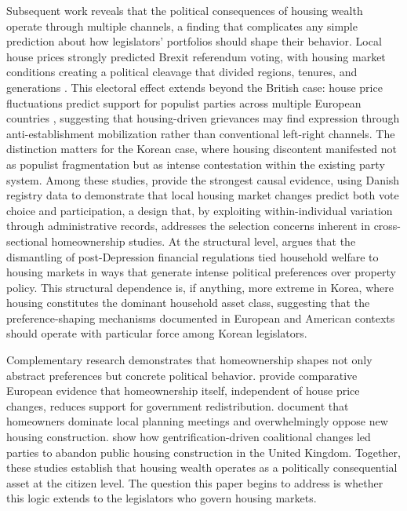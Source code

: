 \documentclass[11pt]{article}
\begin{document}
Subsequent work reveals that the political consequences of housing wealth operate through multiple channels, a finding that complicates any simple prediction about how legislators' portfolios should shape their behavior. Local house prices strongly predicted Brexit referendum voting, with housing market conditions creating a political cleavage that divided regions, tenures, and generations \citep{ansellAdler2019}. This electoral effect extends beyond the British case: house price fluctuations predict support for populist parties across multiple European countries \citep{ansellEtAl2021}, suggesting that housing-driven grievances may find expression through anti-establishment mobilization rather than conventional left-right channels. The distinction matters for the Korean case, where housing discontent manifested not as populist fragmentation but as intense contestation within the existing party system. Among these studies, \citet{larsen2019} provide the strongest causal evidence, using Danish registry data to demonstrate that local housing market changes predict both vote choice and participation, a design that, by exploiting within-individual variation through administrative records, addresses the selection concerns inherent in cross-sectional homeownership studies. At the structural level, \citet{schwartz2012} argues that the dismantling of post-Depression financial regulations tied household welfare to housing markets in ways that generate intense political preferences over property policy. This structural dependence is, if anything, more extreme in Korea, where housing constitutes the dominant household asset class, suggesting that the preference-shaping mechanisms documented in European and American contexts should operate with particular force among Korean legislators.

Complementary research demonstrates that homeownership shapes not only abstract preferences but concrete political behavior. \citet{andre2014} provide comparative European evidence that homeownership itself, independent of house price changes, reduces support for government redistribution. \citet{einstein2019} document that homeowners dominate local planning meetings and overwhelmingly oppose new housing construction. \citet{chouDancygier2021} show how gentrification-driven coalitional changes led parties to abandon public housing construction in the United Kingdom. Together, these studies establish that housing wealth operates as a politically consequential asset at the citizen level. The question this paper begins to address is whether this logic extends to the legislators who govern housing markets.
\end{document}
